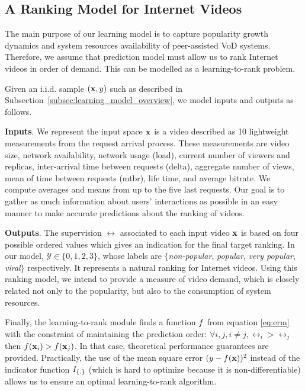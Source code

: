 \subsection{A Ranking Model for Internet Videos}
\label{subsec:learning_model_details}

The main purpose of our learning model is to capture popularity growth dynamics and system resources availability of peer-assisted VoD systems. Therefore, we assume that prediction model must allow us to rank Internet videos in order of demand. This can be modelled as a learning-to-rank problem. 

Given an i.i.d. sample $({\bf x},y)$ such as described in Subsection~\ref{subsec:learning_model_overview}, we model inputs and outputs as follows. 

\noindent
\textbf{Inputs}. We represent the input space ${\bf x}$ is a video described as 10 lightweight measurements from the request arrival process.  These measurements are video size, network availability, network usage (load), current number of viewers and replicas, inter-arrival time between requests (delta), aggregate number of views, mean of time between requests (mtbr), life time, and average bitrate. We compute averages and means from up to the five last requests. Our goal is to gather as much information about users' interactions as possible in an easy manner to make accurate predictions about the ranking of videos.

\noindent
\textbf{Outputs}. The supervision $\rel$ associated to each input video ${\bf x}$ is based on four possible ordered values which gives an indication for the final target ranking. In our model, $\mathcal{Y} \in \{0,1,2,3\}$, whose labels are $\{$\emph{non-popular}, \emph{popular}, \emph{very popular}, \emph{viral}$\}$ respectively. It represents a natural ranking for Internet videos. Using this ranking model, we intend to provide a measure of video demand, which is closely related not only to the popularity, but also to the consumption of system resources.

Finally, the learning-to-rank module finds a function $f$ from equation \eqref{eq:erm} with the constraint of maintaining the prediction order: $\forall i,j, i \neq j, \rel_i > \rel_j$ then $f({\bf x}_i) > f({\bf x}_j)$. %
In that case, theoretical performance guarantees are provided. Practically, the use of the mean square error $(y - f({\bf x}))^2$ instead of the indicator function  $I_{\left \{ . \right \}}$ (which is hard to optimize because it is non-differentiable) allows us to ensure an optimal learning-to-rank algorithm.

